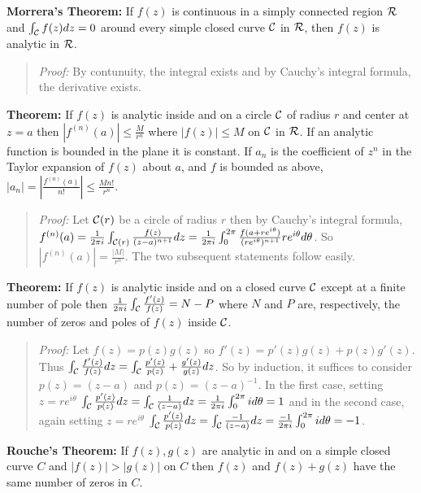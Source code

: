 {\bf Morrera's Theorem:}
If $f(z)$ is continuous in a simply connected region ${\cal R}$ and
$\int_{\cal C} f(z) dz = 0$ around every simple closed curve
${\cal C}$ in ${\cal R}$, then $f(z)$ is analytic in ${\cal R}$.
\begin{quote}
\emph{Proof:}
By contunuity, the integral exists and by Cauchy's integral formula, the derivative exists.
\end{quote}
{\bf Theorem:}
If $f(z)$ is analytic inside and on a circle ${\cal C}$ of
radius $r$ and center at $z=a$ then $|f^{(n)}(a)| \leq {\frac {M} {r^n}}$ where
$|f(z)| \leq M$ on ${\cal C}$ in ${\cal R}$.  If an analytic function is bounded in the
plane it is constant.  If $a_n$ is the coefficient of $z^n$ in the Taylor expansion of
$f(z)$ about $a$, and $f$ is bounded as above, 
$|a_n|= |{\frac {f^{(n)}(a)} {n!}}| \leq {\frac {M n!} {r^n}}$.
\begin{quote}
\emph{Proof:}
Let ${\cal C}(r)$ be a circle of radius $r$ then by Cauchy's integral formula,
$f^{(n)}(a)= 
{\frac 1 {2 \pi i}} \int_{{\cal C}(r)} {\frac {f(z)} {(z-a)^{n+1}}} dz=
{\frac 1 {2 \pi i}} \int_{0}^{2 \pi} 
{\frac {f(a+re^{i \theta})} {(re^{i \theta})^{n+1}}} r e^{i \theta} d \theta$.
So $|f^{(n)}(a)|= {\frac {|M|} {r^n}}$.  The two subsequent statements follow easily.
\end{quote}
{\bf Theorem:}
If $f(z)$ is analytic inside and on a closed curve ${\cal C}$ except at
a finite number of pole
then  ${\frac 1 {2 \pi i}} \int_{\cal C} {\frac {f'(z)} {f(z)}} =
N-P$ where $N$ and $P$ are, respectively, the number of zeros and poles of
$f(z)$ inside ${\cal C}$.
\begin{quote}
\emph{Proof:}
Let $f(z)= p(z) g(z)$ so $f'(z)= p'(z)g(z)+p(z)g'(z)$.  Thus
$\int_{\cal C} {\frac {f'(z)} {f(z)}} dz= 
\int_{\cal C} {\frac {p'(z)} {p(z)}} + {\frac {g'(z)} {g(z)}} dz $.  So by induction,
it suffices to consider $p(z)= (z-a)$ and $p(z)= (z-a)^{-1}$.  In the first case, 
setting $z=re^{i \theta}$
$\int_{\cal C} {\frac {p'(z)} {p(z)}} dz= 
\int_{\cal C} {\frac {1} {(z-a)}} dz= {\frac 1 {2 \pi i}} \int_0^{2 \pi} i d \theta = 1$
and in the second case, again setting $z=re^{i \theta}$
$\int_{\cal C} {\frac {p'(z)} {p(z)}} dz= 
\int_{\cal C} {\frac {-1} {(z-a)}} dz= {\frac {-1} {2 \pi i}} \int_0^{2 \pi} i d \theta = -1$.
\end{quote}
{\bf Rouche's Theorem:} If $f(z), g(z)$ are analytic 
in and on a simple closed curve $C$
and $|f(z)|>|g(z)|$ on $C$ then
$f(z)$ and $f(z)+g(z)$ have the same number of zeros in $C$.
